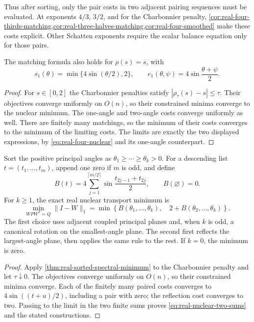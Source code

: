 Thus after sorting, only the pair costs in two adjacent pairing sequences
must be evaluated. At exponents $4/3$, $3/2$, and for the Charbonnier penalty,
\cref{cor:real-four-thirds-matching,cor:real-three-halves-matching,cor:real-four-smoothed} make these
costs explicit. Other Schatten exponents require the scalar balance
equation only for those pairs.

\begin{corollary}
\label{cor:real-nuclear-matching}
The matching formula also holds for $\rho(s)=s$, with
\[
 s_1(\theta)=\min\{4\sin(\theta/2),2\},\qquad
 e_1(\theta,\psi)=4\sin\frac{\theta+\psi}{2}.
\]
\end{corollary}

\begin{proof}
For $s\in[0,2]$ the Charbonnier penalties satisfy
$|\rho_\tau(s)-s|\leq\tau$. Their objectives converge uniformly on
$O(n)$, so their constrained minima converge to the nuclear minimum.
The one-angle and two-angle costs converge uniformly as well.
There are finitely many matchings, so the minimum of their costs
converges to the minimum of the limiting costs. The limits are exactly
the two displayed expressions, by \cref{eq:real-four-nuclear} and its
one-angle counterpart.
\end{proof}

\begin{theorem}
\label{thm:real-nuclear-two-sums}
Sort the positive principal angles as
$\theta_1\geq\cdots\geq\theta_k>0$.
For a descending list $t=(t_1,\ldots,t_m)$, append one zero if $m$ is
odd, and define
\[
 B(t)=4\sum_{j=1}^{\lceil m/2\rceil}
           \sin\frac{t_{2j-1}+t_{2j}}2,
 \qquad B(\varnothing)=0.
\]
For $k\geq1$, the exact real nuclear transport minimum is
\begin{equation}
 \min_{WPW^T=Q}\|I-W\|_1
  =\min\left\{B(\theta_1,\ldots,\theta_k),\quad
               2+B(\theta_2,\ldots,\theta_k)\right\}.
 \label{eq:real-nuclear-two-sums}
\end{equation}
The first choice uses adjacent coupled principal planes and, when $k$ is
odd, a canonical rotation on the smallest-angle plane. The second first
reflects the largest-angle plane, then applies the same rule to the rest.
If $k=0$, the minimum is zero.
\end{theorem}

\begin{proof}
Apply \cref{thm:real-sorted-spectral-minimum} to the Charbonnier penalty
and let $\tau\downarrow0$. The objectives converge uniformly on $O(n)$,
so their constrained minima converge. Each of the finitely many paired
costs converges to $4\sin((t+u)/2)$, including a pair with zero; the
reflection cost converges to two. Passing to the limit in the two finite
sums proves \cref{eq:real-nuclear-two-sums} and the stated constructions.
\end{proof}

